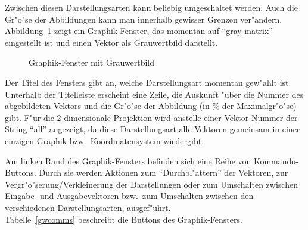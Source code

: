 Zwischen diesen Darstellungsarten kann beliebig umgeschaltet werden.
Auch die Gr"o"se der Abbildungen kann man innerhalb gewisser Grenzen
ver"andern.
Abbildung~\ref{grayMat} zeigt ein Graphik-Fenster, das momentan 
auf "`gray matrix"' eingestellt ist und einen Vektor als Grauwertbild
darstellt.

\begin{figure}[ht]
\centerline{}
\caption{\label{grayMat} Graphik-Fenster mit Grauwertbild}
\end{figure}

Der Titel des Fensters gibt an, welche Darstellungsart momentan gew"ahlt ist.
Unterhalb der Titelleiste erscheint eine Zeile, die Auskunft "uber die
Nummer des abgebildeten Vektors und die Gr"o"se der Abbildung (in \%
der Maximalgr"o"se) gibt.
F"ur die 2-dimensionale Projektion wird anstelle einer Vektor-Nummer
der String "`all"' angezeigt, da diese Darstellungsart alle Vektoren
gemeinsam in einer einzigen Graphik bzw.~Koordinatensystem wiedergibt. 

Am linken Rand des Graphik-Fensters befinden sich eine Reihe von 
Kommando-Buttons.
Durch sie werden Aktionen zum "`Durchbl"attern"' der Vektoren, zur
Ver\-gr"o"ser\-ung/Ver\-kleiner\-ung der Darstellungen oder zum Umschalten
zwischen Eingabe- und Ausgabevektoren bzw.~zum Umschalten zwischen den
verschiedenen Darstellungsarten, ausgef"uhrt. \\
Tabelle~\ref{gwcomms} beschreibt die Buttons des Graphik-Fensters.

